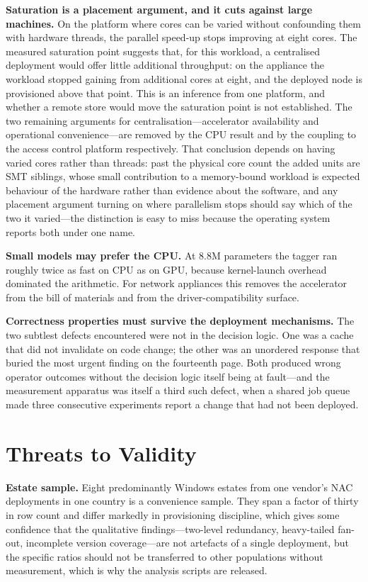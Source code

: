 \documentclass[fleqn,10pt,lineno]{wlpeerj}
\begin{document}
\textbf{Saturation is a placement argument, and it cuts against large machines.} On the platform where cores can be varied without confounding them with hardware threads, the parallel speed-up stops improving at eight cores. The measured saturation point suggests that, for this workload, a centralised deployment would offer little additional throughput: on the appliance the workload stopped gaining from additional cores at eight, and the deployed node is provisioned above that point. This is an inference from one platform, and whether a remote store would move the saturation point is not established. The two remaining arguments for centralisation---accelerator availability and operational convenience---are removed by the CPU result and by the coupling to the access control platform respectively. That conclusion depends on having varied cores rather than threads: past the physical core count the added units are SMT siblings, whose small contribution to a memory-bound workload is expected behaviour of the hardware rather than evidence about the software, and any placement argument turning on where parallelism stops should say which of the two it varied---the distinction is easy to miss because the operating system reports both under one name.

\textbf{Small models may prefer the CPU.} At 8.8M parameters the tagger ran roughly twice as fast on CPU as on GPU, because kernel-launch overhead dominated the arithmetic. For network appliances this removes the accelerator from the bill of materials and from the driver-compatibility surface.

\textbf{Correctness properties must survive the deployment mechanisms.} The two subtlest defects encountered were not in the decision logic. One was a cache that did not invalidate on code change; the other was an unordered response that buried the most urgent finding on the fourteenth page. Both produced wrong operator outcomes without the decision logic itself being at fault---and the measurement apparatus was itself a third such defect, when a shared job queue made three consecutive experiments report a change that had not been deployed.

\section{Threats to Validity}
\label{sec:threats}

\textbf{Estate sample.} Eight predominantly Windows estates from one vendor's NAC deployments in one country is a convenience sample. They span a factor of thirty in row count and differ markedly in provisioning discipline, which gives some confidence that the qualitative findings---two-level redundancy, heavy-tailed fan-out, incomplete version coverage---are not artefacts of a single deployment, but the specific ratios should not be transferred to other populations without measurement, which is why the analysis scripts are released.
\end{document}
